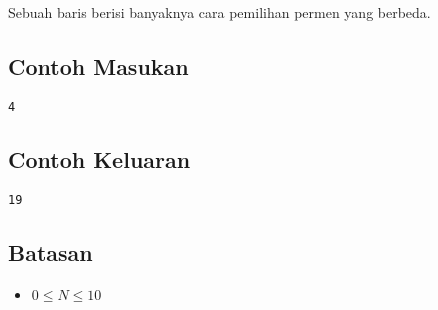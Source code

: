 \documentclass{article}
\begin{document}
\par\noindent Sebuah baris berisi banyaknya cara pemilihan permen yang berbeda.

\subsection*{Contoh Masukan}

\begin{lstlisting}
4
\end{lstlisting}

\subsection*{Contoh Keluaran}

\begin{lstlisting}
19
\end{lstlisting}


\subsection*{Batasan}

\begin{itemize}
	\item $0 \leq N \leq 10$
\end{itemize}
\end{document}
